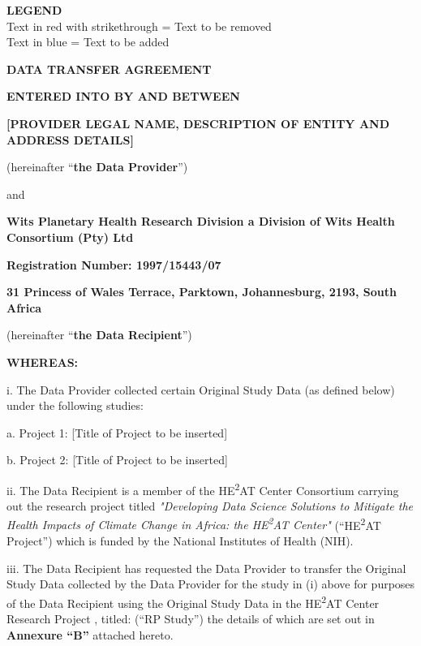 \begin{center}
\textbf{LEGEND}\\
\textcolor{deletecolor}{Text in red with strikethrough} = Text to be removed\\
\textcolor{addcolor}{Text in blue} = Text to be added
\end{center}

\vspace{1cm}

\textbf{DATA TRANSFER AGREEMENT}

\textbf{ENTERED INTO BY AND BETWEEN}

\textbf{[PROVIDER LEGAL NAME, DESCRIPTION OF ENTITY AND ADDRESS DETAILS]}

(hereinafter ``\textbf{the Data Provider}'')

and

\textbf{Wits Planetary Health Research Division a Division of Wits Health Consortium (Pty) Ltd}

\textbf{Registration Number: 1997/15443/07}

\textbf{31 Princess of Wales Terrace, Parktown, Johannesburg, 2193, South Africa}

(hereinafter ``\textbf{the Data Recipient}'')

\textbf{WHEREAS:}

i. The Data Provider collected certain Original Study Data (as defined below) under the following studies:

a. Project 1: [Title of Project to be inserted]

b. Project 2: [Title of Project to be inserted]

ii. The Data Recipient is a member of the HE\textsuperscript{2}AT Center Consortium carrying out the research project titled \textit{"Developing Data Science Solutions to Mitigate the Health Impacts of Climate Change in Africa: the HE\textsuperscript{2}AT Center"} (``HE\textsuperscript{2}AT Project'') which is funded by the National Institutes of Health (NIH).

iii. The Data Recipient has requested the Data Provider to transfer the Original Study Data collected by the Data Provider for the study in (i) above for purposes of the Data Recipient using the Original Study Data in the HE\textsuperscript{2}AT Center Research Project , titled:  (``RP Study'') the details of which are set out in \textbf{Annexure ``B''} attached hereto.

